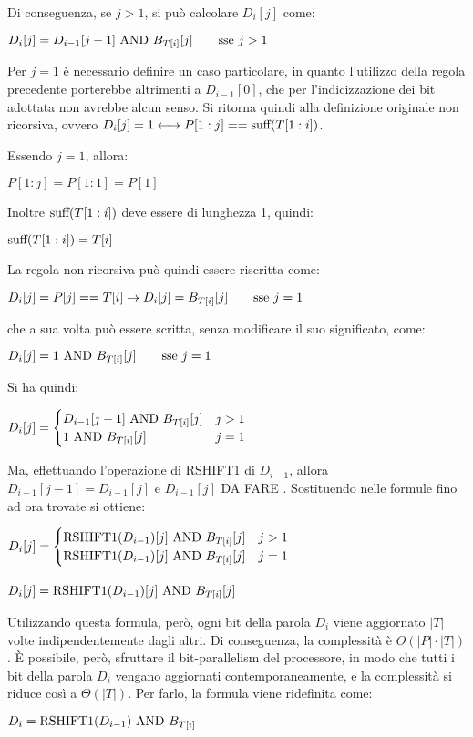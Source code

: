 Di conseguenza, se $j > 1$, si può calcolare $D_i[j]$ come:
\begin{center}
    $D_i[j] = D_{i-1}[j-1] \textnormal{ AND } B_{T[i]}[j] \quad \quad \textnormal{sse } j > 1$
\end{center}
Per $j = 1$ è necessario definire un caso particolare, in quanto l'utilizzo della regola precedente porterebbe altrimenti a $D_{i-1}[0]$, che per l'indicizzazione dei bit adottata non avrebbe alcun senso.
Si ritorna quindi alla definizione originale non ricorsiva, ovvero $D_i[j] = 1 \longleftrightarrow P[1:j] == \textnormal{suff}(T[1:i])$.

Essendo $j = 1$, allora:
\begin{center}
    $P[1:j] = P[1:1] = P[1]$
\end{center}
Inoltre $\textnormal{suff}(T[1:i])$ deve essere di lunghezza 1, quindi:
\begin{center}
    $\textnormal{suff}(T[1:i]) = T[i]$
\end{center}
La regola non ricorsiva può quindi essere riscritta come:
\begin{center}
    $D_i[j] = P[j] == T[i] \rightarrow D_i[j] = B_{T[i]}[j] \quad \quad \textnormal{sse } j = 1$
\end{center}
che a sua volta può essere scritta, senza modificare il suo significato, come:
\begin{center}
    $D_i[j] = 1 \textnormal{ AND } B_{T[i]}[j] \quad \quad \textnormal{sse } j = 1$
\end{center}
Si ha quindi:
\begin{center}
    $D_i[j] = \begin{cases}
        D_{i-1}[j-1] \textnormal{ AND } B_{T[i]}[j] & j > 1 \\
        1 \textnormal{ AND } B_{T[i]}[j] & j = 1
    \end{cases}$
\end{center}
Ma, effettuando l'operazione di RSHIFT1 di $D_{i-1}$, allora $D_{i-1}[j-1] = D_{i-1}[j]$ e $D_{i-1}[j]$ DA FARE . Sostituendo nelle formule fino ad ora trovate si ottiene:
\begin{center}
    $D_i[j] = \begin{cases}
        \textnormal{RSHIFT1}(D_{i-1})[j] \textnormal{ AND } B_{T[i]}[j] & j > 1 \\
        \textnormal{RSHIFT1}(D_{i-1})[j] \textnormal{ AND } B_{T[i]}[j] & j = 1
    \end{cases}$\\
    \big\downarrow\\
    $D_i[j] = \textnormal{RSHIFT1}(D_{i-1})[j] \textnormal{ AND } B_{T[i]}[j]$
\end{center}
Utilizzando questa formula, però, ogni bit della parola $D_i$ viene aggiornato $|T|$ volte indipendentemente dagli altri. Di conseguenza, la complessità è $O(|P| \cdot |T|)$.
È possibile, però, sfruttare il bit-parallelism del processore, in modo che tutti i bit della parola $D_i$ vengano aggiornati contemporaneamente, e la complessità si riduce così a $\Theta(|T|)$.
Per farlo, la formula viene ridefinita come:
\begin{center}
    $D_i = \textnormal{RSHIFT1}(D_{i-1}) \textnormal{ AND } B_{T[i]}$
\end{center}

